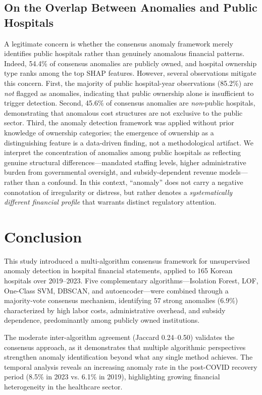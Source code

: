 \documentclass{ieeeaccess}
\begin{document}
\subsection{On the Overlap Between Anomalies and Public Hospitals}

A legitimate concern is whether the consensus anomaly framework merely identifies public hospitals rather than genuinely anomalous financial patterns. Indeed, 54.4\% of consensus anomalies are publicly owned, and hospital ownership type ranks among the top SHAP features. However, several observations mitigate this concern. First, the majority of public hospital-year observations (85.2\%) are \textit{not} flagged as anomalies, indicating that public ownership alone is insufficient to trigger detection. Second, 45.6\% of consensus anomalies are \textit{non}-public hospitals, demonstrating that anomalous cost structures are not exclusive to the public sector. Third, the anomaly detection framework was applied without prior knowledge of ownership categories; the emergence of ownership as a distinguishing feature is a data-driven finding, not a methodological artifact. We interpret the concentration of anomalies among public hospitals as reflecting genuine structural differences---mandated staffing levels, higher administrative burden from governmental oversight, and subsidy-dependent revenue models---rather than a confound. In this context, ``anomaly'' does not carry a negative connotation of irregularity or distress, but rather denotes a \textit{systematically different financial profile} that warrants distinct regulatory attention.

\section{Conclusion}
\label{sec:conclusion}

This study introduced a multi-algorithm consensus framework for unsupervised anomaly detection in hospital financial statements, applied to 165 Korean hospitals over 2019--2023. Five complementary algorithms---Isolation Forest, LOF, One-Class SVM, DBSCAN, and autoencoder---were combined through a majority-vote consensus mechanism, identifying 57 strong anomalies (6.9\%) characterized by high labor costs, administrative overhead, and subsidy dependence, predominantly among publicly owned institutions.

The moderate inter-algorithm agreement (Jaccard 0.24--0.50) validates the consensus approach, as it demonstrates that multiple algorithmic perspectives strengthen anomaly identification beyond what any single method achieves. The temporal analysis reveals an increasing anomaly rate in the post-COVID recovery period (8.5\% in 2023 vs. 6.1\% in 2019), highlighting growing financial heterogeneity in the healthcare sector.
\end{document}
